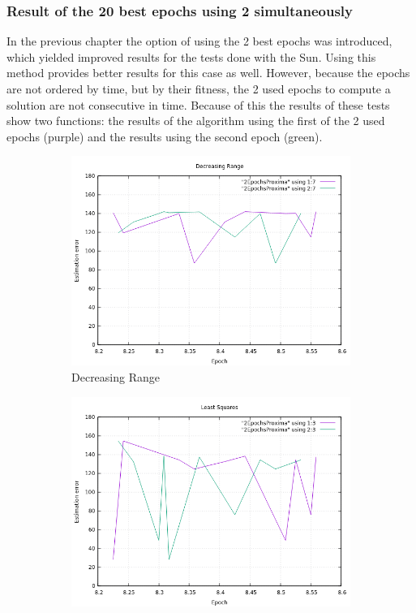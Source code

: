 \clearpage
\subsubsection{Result of the 20 best epochs using 2 simultaneously}

In the previous chapter the option of using the 2 best epochs was introduced, which yielded improved results for the tests done with the Sun. Using this method provides better results for this case as well. However, 
because the epochs are not ordered by time, but by their fitness, the 2 used epochs to compute a solution are not consecutive in time. Because of this the results of these tests show two functions: the results of the algorithm using the first of the 2 used epochs (purple) and the results using the second epoch (green).

\begin{figure}[!htb]
	\begin{subfigure}[b]{0.5\textwidth}
		\includegraphics[width=\linewidth]{images/resultsStellar/20Epochs2Epochs/2EpochsProximaDR.png}
		\caption{Decreasing Range}
	\end{subfigure}
	\hfill
	\begin{subfigure}[b]{0.5\textwidth}
		\includegraphics[width=\linewidth]{images/resultsStellar/20Epochs2Epochs/2EpochsProximaLS1.png}

\end{subfigure}
\end{figure}
